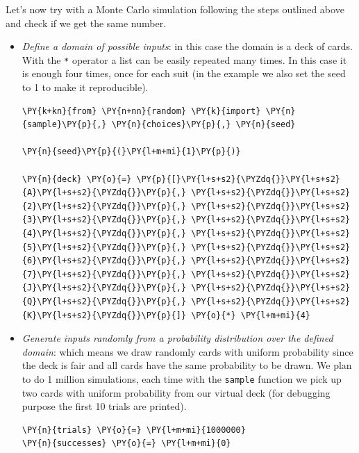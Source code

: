 Let's now try with a Monte Carlo simulation following the steps outlined above and check if we get the same number.
\begin{itemize}
\item \emph{Define a domain of possible inputs}: in this case the domain is a deck of cards. With the \texttt{*} operator a list can be easily repeated many times. In this case it is enough four times, once for each suit (in the example we also set the seed to 1 to make it reproducible).

\begin{tcolorbox}[breakable, size=fbox, boxrule=1pt, pad at break*=1mm,colback=cellbackground, colframe=cellborder]
\begin{Verbatim}[commandchars=\\\{\}]
\PY{k+kn}{from} \PY{n+nn}{random} \PY{k}{import} \PY{n}{sample}\PY{p}{,} \PY{n}{choices}\PY{p}{,} \PY{n}{seed}

\PY{n}{seed}\PY{p}{(}\PY{l+m+mi}{1}\PY{p}{)}

\PY{n}{deck} \PY{o}{=} \PY{p}{[}\PY{l+s+s2}{\PYZdq{}}\PY{l+s+s2}{A}\PY{l+s+s2}{\PYZdq{}}\PY{p}{,} \PY{l+s+s2}{\PYZdq{}}\PY{l+s+s2}{2}\PY{l+s+s2}{\PYZdq{}}\PY{p}{,} \PY{l+s+s2}{\PYZdq{}}\PY{l+s+s2}{3}\PY{l+s+s2}{\PYZdq{}}\PY{p}{,} \PY{l+s+s2}{\PYZdq{}}\PY{l+s+s2}{4}\PY{l+s+s2}{\PYZdq{}}\PY{p}{,} \PY{l+s+s2}{\PYZdq{}}\PY{l+s+s2}{5}\PY{l+s+s2}{\PYZdq{}}\PY{p}{,} \PY{l+s+s2}{\PYZdq{}}\PY{l+s+s2}{6}\PY{l+s+s2}{\PYZdq{}}\PY{p}{,} \PY{l+s+s2}{\PYZdq{}}\PY{l+s+s2}{7}\PY{l+s+s2}{\PYZdq{}}\PY{p}{,} \PY{l+s+s2}{\PYZdq{}}\PY{l+s+s2}{J}\PY{l+s+s2}{\PYZdq{}}\PY{p}{,} \PY{l+s+s2}{\PYZdq{}}\PY{l+s+s2}{Q}\PY{l+s+s2}{\PYZdq{}}\PY{p}{,} \PY{l+s+s2}{\PYZdq{}}\PY{l+s+s2}{K}\PY{l+s+s2}{\PYZdq{}}\PY{p}{]} \PY{o}{*} \PY{l+m+mi}{4}
 \end{Verbatim}
\end{tcolorbox}

\item \emph{Generate inputs randomly from a probability distribution over the defined domain}: which means we draw randomly cards with uniform probability since the deck is fair and all cards have the same probability to be drawn. 
We plan to do 1 million simulations, each time with the \texttt{sample} function we pick up two cards with uniform probability from our virtual deck (for debugging purpose the first 10 trials are printed).

\begin{tcolorbox}[breakable, size=fbox, boxrule=1pt, pad at break*=1mm,colback=cellbackground, colframe=cellborder]
\begin{Verbatim}[commandchars=\\\{\}]
\PY{n}{trials} \PY{o}{=} \PY{l+m+mi}{1000000}
\PY{n}{successes} \PY{o}{=} \PY{l+m+mi}{0}


\end{Verbatim}
\end{tcolorbox}
\end{itemize}
